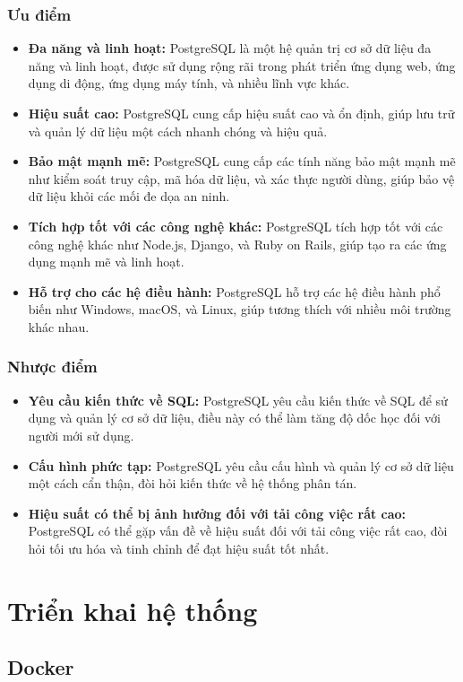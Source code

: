 \subsubsection{Ưu điểm}
\begin{itemize}
  \item \textbf{Đa năng và linh hoạt:} PostgreSQL là một hệ quản trị cơ sở dữ liệu đa năng và linh hoạt, được sử dụng rộng rãi trong phát triển ứng dụng web, ứng dụng di động, ứng dụng máy tính, và nhiều lĩnh vực khác.
  \item \textbf{Hiệu suất cao:} PostgreSQL cung cấp hiệu suất cao và ổn định, giúp lưu trữ và quản lý dữ liệu một cách nhanh chóng và hiệu quả.
  \item \textbf{Bảo mật mạnh mẽ:} PostgreSQL cung cấp các tính năng bảo mật mạnh mẽ như kiểm soát truy cập, mã hóa dữ liệu, và xác thực người dùng, giúp bảo vệ dữ liệu khỏi các mối đe dọa an ninh.
  \item \textbf{Tích hợp tốt với các công nghệ khác:} PostgreSQL tích hợp tốt với các công nghệ khác như Node.js, Django, và Ruby on Rails, giúp tạo ra các ứng dụng mạnh mẽ và linh hoạt.
  \item \textbf{Hỗ trợ cho các hệ điều hành:} PostgreSQL hỗ trợ các hệ điều hành phổ biến như Windows, macOS, và Linux, giúp tương thích với nhiều môi trường khác nhau.
\end{itemize}
\subsubsection{Nhược điểm}
\begin{itemize}
  \item \textbf{Yêu cầu kiến thức về SQL:} PostgreSQL yêu cầu kiến thức về SQL để sử dụng và quản lý cơ sở dữ liệu, điều này có thể làm tăng độ dốc học đối với người mới sử dụng.
  \item \textbf{Cấu hình phức tạp:} PostgreSQL yêu cầu cấu hình và quản lý cơ sở dữ liệu một cách cẩn thận, đòi hỏi kiến thức về hệ thống phân tán.
  \item \textbf{Hiệu suất có thể bị ảnh hưởng đối với tải công việc rất cao:} PostgreSQL có thể gặp vấn đề về hiệu suất đối với tải công việc rất cao, đòi hỏi tối ưu hóa và tinh chỉnh để đạt hiệu suất tốt nhất.
\end{itemize}
\section{Triển khai hệ thống}
\subsection{Docker}
